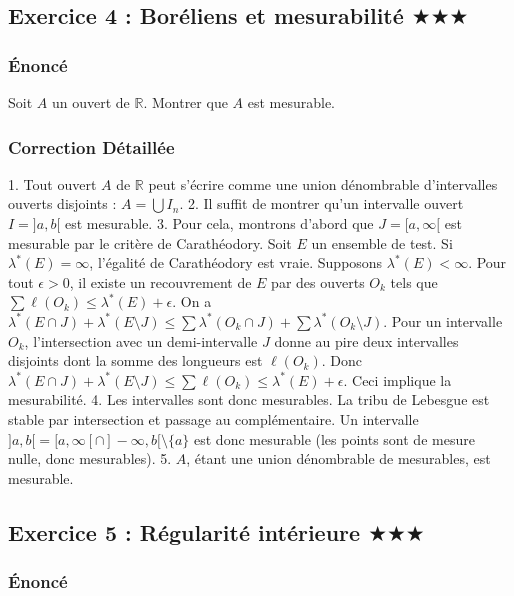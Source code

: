 \documentclass[11pt,a4paper]{article}
\begin{document}
\subsection*{Exercice 4 : Boréliens et mesurabilité \quad $\displaystyle \bigstar\bigstar\bigstar$}


\subsubsection*{Énoncé}

Soit $A$ un ouvert de $\mathbb{R}$. Montrer que $A$ est mesurable.

\subsubsection*{Correction Détaillée}

1. Tout ouvert $A$ de $\mathbb{R}$ peut s'écrire comme une union dénombrable d'intervalles ouverts disjoints : $A = \bigcup I_n$.
2. Il suffit de montrer qu'un intervalle ouvert $I = ]a, b[$ est mesurable.
3. Pour cela, montrons d'abord que $J = [a, \infty[$ est mesurable par le critère de Carathéodory.
Soit $E$ un ensemble de test. Si $\lambda^*(E) = \infty$, l'égalité de Carathéodory est vraie. Supposons $\lambda^*(E) < \infty$.
Pour tout $\epsilon > 0$, il existe un recouvrement de $E$ par des ouverts $O_k$ tels que $\sum \ell(O_k) \le \lambda^*(E) + \epsilon$.
On a $\lambda^*(E \cap J) + \lambda^*(E \setminus J) \le \sum \lambda^*(O_k \cap J) + \sum \lambda^*(O_k \setminus J)$.
Pour un intervalle $O_k$, l'intersection avec un demi-intervalle $J$ donne au pire deux intervalles disjoints dont la somme des longueurs est $\ell(O_k)$.
Donc $\lambda^*(E \cap J) + \lambda^*(E \setminus J) \le \sum \ell(O_k) \le \lambda^*(E) + \epsilon$. Ceci implique la mesurabilité.
4. Les intervalles sont donc mesurables. La tribu de Lebesgue est stable par intersection et passage au complémentaire. Un intervalle $]a, b[ = [a, \infty[ \cap ]-\infty, b[ \setminus \{a\}$ est donc mesurable (les points sont de mesure nulle, donc mesurables).
5. $A$, étant une union dénombrable de mesurables, est mesurable.


\subsection*{Exercice 5 : Régularité intérieure \quad $\displaystyle \bigstar\bigstar\bigstar$}


\subsubsection*{Énoncé}
\end{document}
